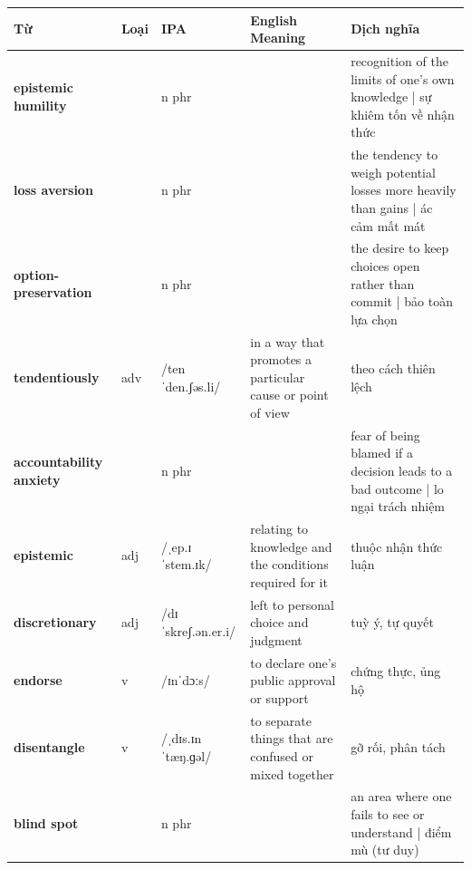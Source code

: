 \vspace{0.8em}
\begin{center}
\renewcommand{\arraystretch}{1.65}
\begin{tabularx}{\textwidth}{|V{0.22\textwidth}|C{0.07\textwidth}|I{0.20\textwidth}|Y|V{0.18\textwidth}|}
\hline
{}
\textbf{Từ} & \textbf{Loại} & \textbf{IPA} & \textbf{English Meaning} & \textbf{Dịch nghĩa} \\
\hline
\textbf{epistemic humility} & & n phr & & recognition of the limits of one's own knowledge | sự khiêm tốn về nhận thức \\ \hline
\textbf{loss aversion} & & n phr & & the tendency to weigh potential losses more heavily than gains | ác cảm mất mát \\ \hline
\textbf{option-preservation} & & n phr & & the desire to keep choices open rather than commit | bảo toàn lựa chọn \\ \hline
\textbf{tendentiously} & adv & /tenˈden.ʃəs.li/ & in a way that promotes a particular cause or point of view & theo cách thiên lệch \\ \hline
\textbf{accountability anxiety} & & n phr & & fear of being blamed if a decision leads to a bad outcome | lo ngại trách nhiệm \\ \hline
\textbf{epistemic} & adj & /ˌep.ɪˈstem.ɪk/ & relating to knowledge and the conditions required for it & thuộc nhận thức luận \\ \hline
\textbf{discretionary} & adj & /dɪˈskreʃ.ən.er.i/ & left to personal choice and judgment & tuỳ ý, tự quyết \\ \hline
\textbf{endorse} & v & /ɪnˈdɔːs/ & to declare one's public approval or support & chứng thực, ủng hộ \\ \hline
\textbf{disentangle} & v & /ˌdɪs.ɪnˈtæŋ.ɡəl/ & to separate things that are confused or mixed together & gỡ rối, phân tách \\ \hline
\textbf{blind spot} & & n phr & & an area where one fails to see or understand | điểm mù (tư duy) \\ \hline
\end{tabularx}
\end{center}

\newpage

